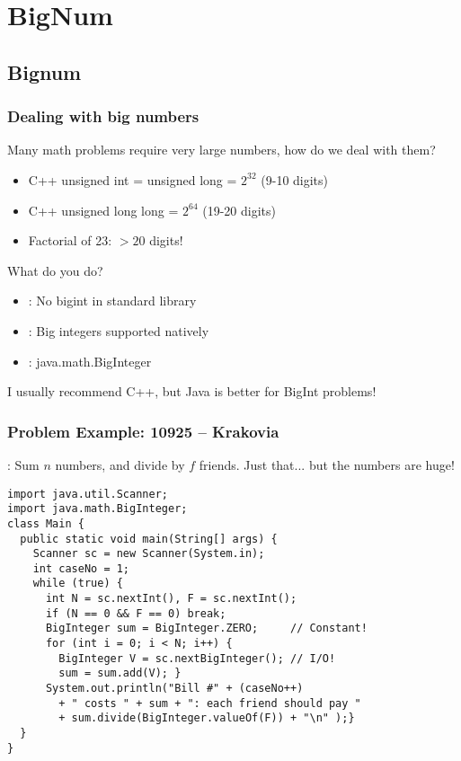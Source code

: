 \documentclass{beamer}
\begin{document}
\section{BigNum}
\subsection{Bignum}
\begin{frame}
  \frametitle{Dealing with big numbers}

  {\smaller
  \begin{block}{}
    Many math problems require very large numbers, how do we deal with them?
  \end{block}

  \begin{itemize}
  \item C++ unsigned int = unsigned long = $2^{32}$ (9-10 digits)
  \item C++ unsigned long long = $2^{64}$ (19-20 digits)

    \medskip

  \item Factorial of 23: $> 20$ digits!
  \end{itemize}

  \begin{block}{What do you do?}
    \begin{itemize}
    \item {}: No bigint in standard library
    \item {}: Big integers supported natively
    \item {}: java.math.BigInteger
    \end{itemize}

    \medskip

    I usually recommend C++, but Java is better for BigInt problems!
  \end{block}
  }
\end{frame}

\begin{frame}[fragile]
  \frametitle{Problem Example: 10925 -- Krakovia}

  {\smaller

  : Sum $n$ numbers, and divide by $f$
  friends. Just that... but the numbers are huge!

\begin{block}{}
\begin{verbatim}
import java.util.Scanner;
import java.math.BigInteger;
class Main {
  public static void main(String[] args) {
    Scanner sc = new Scanner(System.in);
    int caseNo = 1;
    while (true) {
      int N = sc.nextInt(), F = sc.nextInt();
      if (N == 0 && F == 0) break;
      BigInteger sum = BigInteger.ZERO;     // Constant!
      for (int i = 0; i < N; i++) {
        BigInteger V = sc.nextBigInteger(); // I/O!
        sum = sum.add(V); }
      System.out.println("Bill #" + (caseNo++)
        + " costs " + sum + ": each friend should pay "
        + sum.divide(BigInteger.valueOf(F)) + "\n" );}
  }
}
\end{verbatim}
  \end{block}}
\end{frame}
\end{document}
